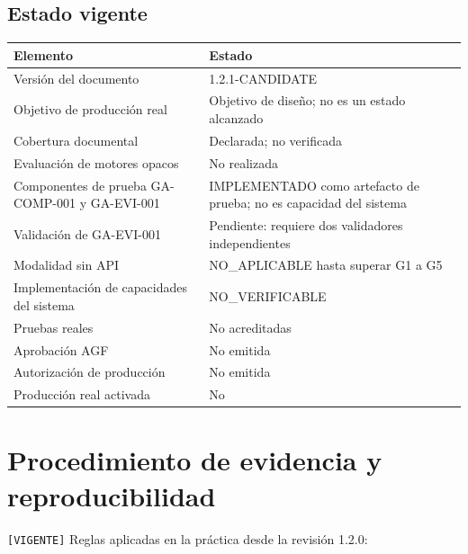 \documentclass[12pt]{article}
\begin{document}
\subsection{Estado vigente}

\begin{longtable}{|p{6.5cm}|p{6.5cm}|}
\hline
\textbf{Elemento} & \textbf{Estado} \\
\hline
\endhead
Versión del documento & 1.2.1-CANDIDATE \\
\hline
Objetivo de producción real & Objetivo de diseño; no es un estado alcanzado \\
\hline
Cobertura documental & Declarada; no verificada \\
\hline
Evaluación de motores opacos & No realizada \\
\hline
Componentes de prueba GA-COMP-001 y GA-EVI-001 & IMPLEMENTADO como artefacto de prueba; no es capacidad del sistema \\
\hline
Validación de GA-EVI-001 & Pendiente: requiere dos validadores independientes \\
\hline
Modalidad sin API & NO\_APLICABLE hasta superar G1 a G5 \\
\hline
Implementación de capacidades del sistema & NO\_VERIFICABLE \\
\hline
Pruebas reales & No acreditadas \\
\hline
Aprobación AGF & No emitida \\
\hline
Autorización de producción & No emitida \\
\hline
Producción real activada & No \\
\hline
\end{longtable}

\section{Procedimiento de evidencia y reproducibilidad}
\label{sec:procedimiento}

\texttt{[VIGENTE]} Reglas aplicadas en la práctica desde la revisión 1.2.0:
\end{document}
